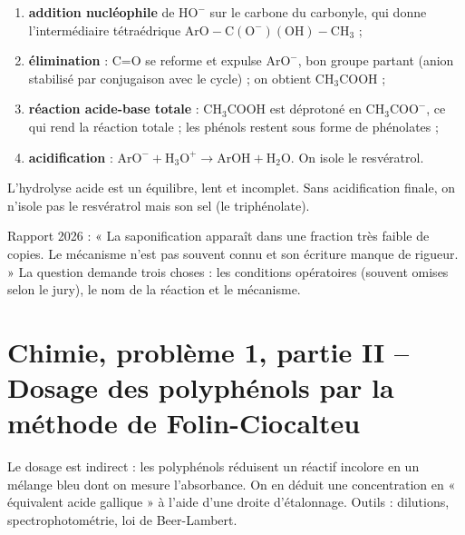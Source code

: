 \documentclass[11pt,a4paper]{article}
\providecommand{\tightlist}{\setlength{\itemsep}{0pt}\setlength{\parskip}{0pt}}
\begin{document}
\begin{enumerate}
\def\labelenumi{\arabic{enumi}.}
\tightlist
\item
  \textbf{addition nucléophile} de \(\mathrm{HO^-}\) sur le carbone du carbonyle, qui donne l'intermédiaire tétraédrique \(\mathrm{ArO{-}C(O^-)(OH){-}CH_3}\) ;
\item
  \textbf{élimination} : C=O se reforme et expulse \(\mathrm{ArO^-}\), bon groupe partant (anion stabilisé par conjugaison avec le cycle) ; on obtient \(\mathrm{CH_3COOH}\) ;
\item
  \textbf{réaction acide-base totale} : \(\mathrm{CH_3COOH}\) est déprotoné en \(\mathrm{CH_3COO^-}\), ce qui rend la réaction totale ; les phénols restent sous forme de phénolates ;
\item
  \textbf{acidification} : \(\mathrm{ArO^-} + \mathrm{H_3O^+} \to \mathrm{ArOH} + \mathrm{H_2O}\). On isole le resvératrol.
\end{enumerate}

\begin{piege}

L'hydrolyse acide est un équilibre, lent et incomplet. Sans acidification finale, on n'isole pas le resvératrol mais son sel (le triphénolate).

\end{piege}

\begin{jury}

Rapport 2026 : « La saponification apparaît dans une fraction très faible de copies. Le mécanisme n'est pas souvent connu et son écriture manque de rigueur. » La question demande trois choses : les conditions opératoires (souvent omises selon le jury), le nom de la réaction et le mécanisme.

\end{jury}

\hypertarget{chimie-probluxe8me-1-partie-ii-dosage-des-polyphuxe9nols-par-la-muxe9thode-de-folin-ciocalteu}{%
\section{Chimie, problème 1, partie II -- Dosage des polyphénols par la méthode de Folin-Ciocalteu}\label{chimie-probluxe8me-1-partie-ii-dosage-des-polyphuxe9nols-par-la-muxe9thode-de-folin-ciocalteu}}

Le dosage est indirect : les polyphénols réduisent un réactif incolore en un mélange bleu dont on mesure l'absorbance. On en déduit une concentration en « équivalent acide gallique » à l'aide d'une droite d'étalonnage. Outils : dilutions, spectrophotométrie, loi de Beer-Lambert.
\end{document}

